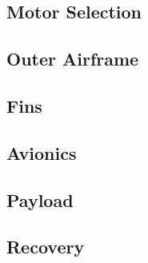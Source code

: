    \subsection{Motor Selection}
    
    \subsection{Outer Airframe}
    
    \subsection{Fins}
    
    \subsection{Avionics}
    
    \subsection{Payload}
    
    \subsection{Recovery}

